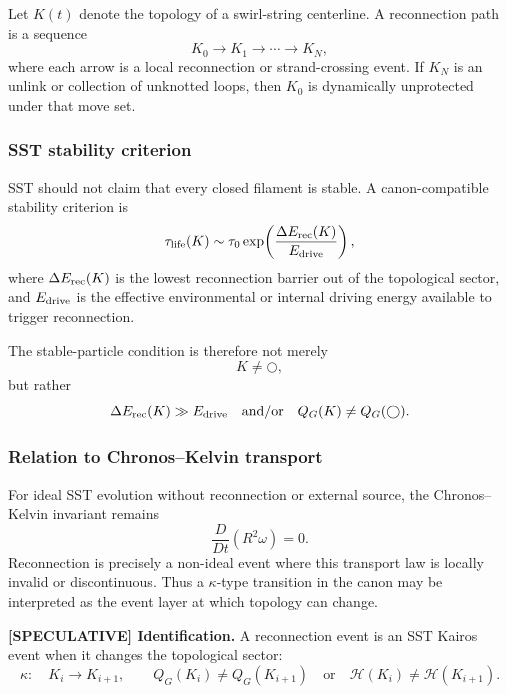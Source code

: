 Let $K(t)$ denote the topology of a swirl-string centerline. A reconnection path is a sequence
\begin{equation}
    K_0 \longrightarrow K_1 \longrightarrow \cdots \longrightarrow K_N,
    \label{eq:reconnection_path}
\end{equation}
where each arrow is a local reconnection or strand-crossing event. If $K_N$ is an unlink or collection of unknotted loops, then $K_0$ is dynamically unprotected under that move set.

\subsubsection{SST stability criterion}
SST should not claim that every closed filament is stable. A canon-compatible stability criterion is
\begin{equation}
    \tau_{\rm life}(K)
    \sim \tau_0\exp\!\left(\frac{\Delta E_{\rm rec}(K)}{E_{\rm drive}}\right),
    \label{eq:sst_lifetime_barrier}
\end{equation}
where $\Delta E_{\rm rec}(K)$ is the lowest reconnection barrier out of the topological sector, and $E_{\rm drive}$ is the effective environmental or internal driving energy available to trigger reconnection.

The stable-particle condition is therefore not merely
\begin{equation}
    K\neq \bigcirc,
\end{equation}
but rather
\begin{equation}
    \Delta E_{\rm rec}(K)\gg E_{\rm drive}
    \quad\text{and/or}\quad
    Q_G(K)\neq Q_G(\bigcirc).
    \label{eq:sst_stability_condition}
\end{equation}

\subsubsection{Relation to Chronos--Kelvin transport}
For ideal SST evolution without reconnection or external source, the Chronos--Kelvin invariant remains
\begin{equation}
    \frac{D}{Dt}\left(R^2\omega\right)=0.
\end{equation}
Reconnection is precisely a non-ideal event where this transport law is locally invalid or discontinuous. Thus a $\kappa$-type transition in the canon may be interpreted as the event layer at which topology can change.

\textbf{[SPECULATIVE] Identification.}
A reconnection event is an SST Kairos event when it changes the topological sector:
\begin{equation}
    \kappa:\quad K_i\rightarrow K_{i+1},
    \qquad
    Q_G(K_i)\neq Q_G(K_{i+1})
    \quad\text{or}\quad
    \mathcal H(K_i)\neq \mathcal H(K_{i+1}).
\end{equation}

